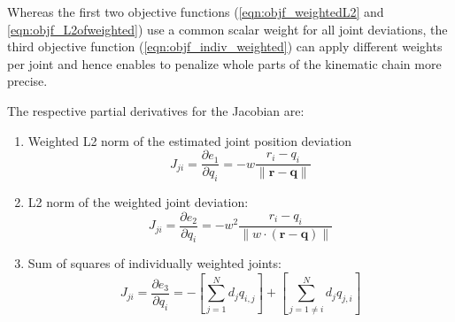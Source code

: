 Whereas the first two objective functions (\ref{eqn:objf_weightedL2} and \ref{eqn:objf_L2ofweighted}) use a common scalar weight for all joint deviations, the third objective function (\ref{eqn:objf_indiv_weighted}) can apply different weights per joint and hence enables to penalize whole parts of the kinematic chain more precise.

The respective partial derivatives for the Jacobian are:
\begin{enumerate}
\item Weighted L2 norm of the estimated joint position deviation
\begin{equation}
J_{ji} = \frac{\partial e_1}{\partial q_i} = -w \frac{r_i - q_i}{\lVert \mathbf{r} - \mathbf{q} \rVert}
\end{equation}

\item L2 norm of the weighted joint deviation:
\begin{equation}
J_{ji} = \frac{\partial e_2}{\partial q_i} = -w^2 \frac{r_i - q_i}{\lVert w \cdot (\mathbf{r} - \mathbf{q}) \rVert}
\end{equation}

\item Sum of squares of individually weighted joints:
\begin{equation}
J_{ji} = \frac{\partial e_3}{\partial q_i} = - \left[ \sum_{j=1}^N d_jq_{i,j}\right] + \left[ \sum_{j=1 \neq i}^N d_jq_{j,i}\right]
\end{equation}
\end{enumerate}

